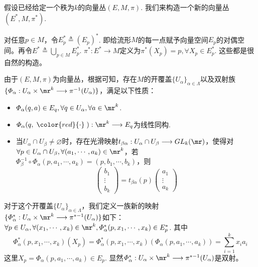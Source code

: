 假设已经给定一个秩为$k$的向量丛$(E,M,\pi)$. 我们来构造一个新的向量丛$(E^{\ast},M,\pi^{\ast})$.

对任意$p\in M$，令$E^{\ast}_{p}\triangleq \left(E_{p} \right)^{\ast}$. 即给流形$M$的每一点赋予向量空间$E_{p}$的对偶空间。再令$E^{\ast}\triangleq \bigcup\limits_{p\in M}E^{\ast}_{p}$. $\pi^{\ast}:E^{\ast}\longrightarrow M$定义为$\pi^{\ast}(X_{p})=p,\forall X_{p}\in E^{\ast}_{p}$. 这些都是很自然的构造。

由于$(E,M,\pi)$为向量丛，根据可知，存在$M$的开覆盖$\{U_{\alpha} \}_{\alpha\in \Lambda}$以及双射族$\{\varPhi_{\alpha}:U_{\alpha}\times \mr^{k}\longrightarrow \pi^{-1}(U_{\alpha}) \}$，满足以下性质：
\begin{itemize}
	\item[(1)] $\varPhi_{\alpha}(q,a)\in E_{q},\forall q\in U_{\alpha},\forall a\in \mr^{k}$.
	\item[(2)] $\varPhi_{\alpha}(q,\;{\color{red}{\cdot}}\;):\mr^{k}\longrightarrow E_{q}$为线性同构.
	\item[(3)] 当$U_{\alpha}\cap U_{\beta}\neq\varnothing$时，存在光滑映射$t_{\beta\alpha}:U_{\alpha}\cap U_{\beta}\longrightarrow GL_{k}(\mr)$，使得对$\forall p\in U_{\alpha}\cap U_{\beta},\forall (a_{1},\cdots,a_{k})\in \mr^{k}$，若$\varPhi_{\beta}^{-1}\circ\varPhi_{\alpha}(p,a_{1},\cdots,a_{k})=(p,b_{1},\cdots,b_{k})$，则
	\[
	\left( \begin{array}{ccc}{b_{1}} \\ {\vdots}  \\ {b_{k}} \end{array}\right)=t_{\beta\alpha}(p) \left( \begin{array}{ccc}{a_{1}} \\ {\vdots}  \\ {a_{k}} \end{array}\right)
	\]
\end{itemize}
	
对于这个开覆盖$\{U_{\alpha} \}_{\alpha\in \Lambda}$，我们定义一族新的映射$\{\varPhi^{\ast}_{\alpha} :U_{\alpha}\times \mr^{k}\longrightarrow \pi^{\ast -1}(U_{\alpha})\}$如下：$\forall p\in U_{\alpha},\forall (x_{1},\cdots,x_{k})\in\mr^{k},\varPhi^{\ast}_{\alpha}(p,x_{1},\cdots,x_{k})\in E^{\ast}_{p}$. 其中
\[
\varPhi^{\ast}_{\alpha}(p,x_{1},\cdots,x_{k})\left(X_{p} \right)=\varPhi^{\ast}_{\alpha}(p,x_{1},\cdots,x_{k})\left(\varPhi_{\alpha}(p,a_{1},\cdots,a_{k}) \right)=\sum_{ i = 1 }^{k}x_{i}a_{i}
\]
这里$X_{p}=\varPhi_{\alpha}(p,a_{1},\cdots,a_{k})\in E_{p}$. 显然$\varPhi^{\ast}_{\alpha} :U_{\alpha}\times \mr^{k}\longrightarrow \pi^{\ast -1}(U_{\alpha})$是双射。

